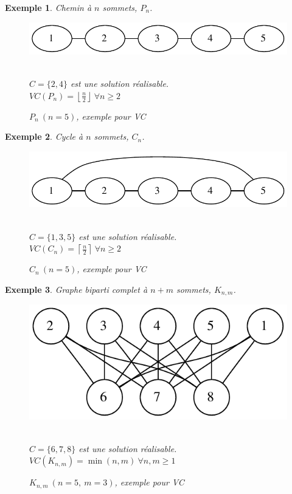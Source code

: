 \documentclass[12pt]{article}
\newcommand{\ceil}[1]{\left\lceil #1 \right\rceil}
\newcommand{\cdil}[1]{\left\lfloor #1 \right\rfloor}
\newtheorem{exemple}{Exemple}[section]
\begin{document}
\begin{exemple}
Chemin à $n$ sommets, $P_n$.\\
\begin{figure}[h!]
    \begin{center}
    \includegraphics[scale=0.5]{pn.pdf}
    \caption{$P_n\ (n=5)$, exemple pour VC}
    $ $ \\
	$C = \{2,4\}$ est une solution réalisable. \\
	$VC(P_n)=\cdil{\frac{n}{2}}\ \forall n \geq 2$
    \end{center}
\end{figure}
\end{exemple}

\begin{exemple}
Cycle à $n$ sommets, $C_n$.\\
\begin{figure}[h!]
    \begin{center}
    \includegraphics[scale=0.5]{cn.pdf}
    \caption{$C_n\ (n=5)$, exemple pour VC}
    $ $ \\
	$C = \{1,3,5\}$ est une solution réalisable. \\
	$VC(C_n)=\ceil{\frac{n}{2}}\ \forall n \geq 2$
    \end{center}
\end{figure}
\end{exemple}


\begin{exemple}
Graphe biparti complet à $n+m$ sommets, $K_{n,m}$.\\
\begin{figure}[h!]
    \begin{center}
    \includegraphics[scale=0.5]{knm.pdf}
    \caption{$K_{n,m}\ (n=5,\ m=3)$, exemple pour VC}
    $ $ \\
	$C = \{6,7,8\}$ est une solution réalisable. \\
	$VC(K_{n,m})=\min{(n,m)}\ \forall n,m \geq 1$
    \end{center}
\end{figure}
\end{exemple}
\end{document}
